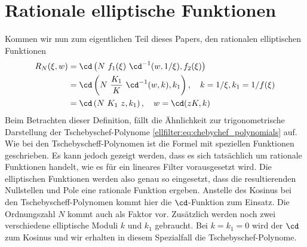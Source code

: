 \section{Rationale elliptische Funktionen}

Kommen wir nun zum eigentlichen Teil dieses Papers, den rationalen elliptischen Funktionen \cite{ellfilter:bib:orfanidis}
\begin{align}
    R_N(\xi, w) &= \cd \left(N~f_1(\xi)~\cd^{-1}(w, 1/\xi), f_2(\xi)\right) \label{ellfilter:eq:elliptic}\\
                &= \cd \left(N~\frac{K_1}{K}~\cd^{-1}(w, k), k_1\right) , \quad k= 1/\xi, k_1 = 1/f(\xi) \\
                &= \cd \left(N~K_1~z , k_1 \right), \quad w= \cd(z K, k)
\end{align}
Beim Betrachten dieser Definition, fällt die Ähnlichkeit zur trigonometrische Darstellung der Tsche\-byschef-Polynome \eqref{ellfilter:eq:chebychef_polynomials} auf.
Wie bei den Tschebyscheff-Polynomen ist die Formel mit speziellen Funktionen geschrieben.
Es kann jedoch gezeigt werden, dass es sich tatsächlich um rationale Funktionen handelt, wie es für ein lineares Filter vorausgesetzt wird.
Die elliptischen Funktionen werden also genau so eingesetzt, dass die resultierenden Nullstellen und Pole eine rationale Funktion ergeben.
Anstelle des Kosinus bei den Tschebyscheff-Polynomen kommt hier die $\cd$-Funktion zum Einsatz.
Die Ordnungszahl $N$ kommt auch als Faktor vor.
Zusätzlich werden noch zwei verschiedene elliptische Moduli $k$ und $k_1$ gebraucht.
Bei $k = k_1 = 0$ wird der $\cd$ zum Kosinus und wir erhalten in diesem Spezialfall die Tschebyschef-Polynome.

